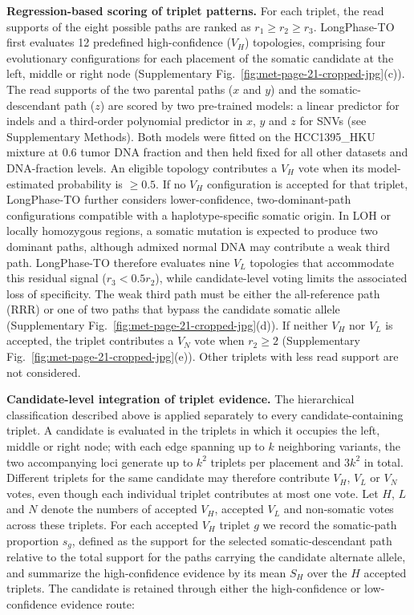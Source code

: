 \documentclass[pdflatex,sn-nature]{sn-jnl}
\begin{document}
\noindent\textbf{Regression-based scoring of triplet patterns.} For each triplet, the read supports of the eight possible paths are ranked as \(r_1\geq r_2\geq r_3\). LongPhase-TO first evaluates 12 predefined high-confidence (\(V_H\)) topologies, comprising four evolutionary configurations for each placement of the somatic candidate at the left, middle or right node (Supplementary Fig.~\ref{fig:met-page-21-cropped-jpg}(c)). The read supports of the two parental paths (\(x\) and \(y\)) and the somatic-descendant path (\(z\)) are scored by two pre-trained models: a linear predictor for indels and a third-order polynomial predictor in \(x\), \(y\) and \(z\) for SNVs (see Supplementary Methods). Both models were fitted on the HCC1395\_HKU mixture at 0.6 tumor DNA fraction and then held fixed for all other datasets and DNA-fraction levels. An eligible topology contributes a \(V_H\) vote when its model-estimated probability is \(\geq0.5\).
If no \(V_H\) configuration is accepted for that triplet, LongPhase-TO further considers lower-confidence, two-dominant-path configurations compatible with a haplotype-specific somatic origin. In LOH or locally homozygous regions, a somatic mutation is expected to produce two dominant paths, although admixed normal DNA may contribute a weak third path. LongPhase-TO therefore evaluates nine \(V_L\) topologies that accommodate this residual signal (\(r_3<0.5r_2\)), while candidate-level voting limits the associated loss of specificity.
The weak third path must be either the all-reference path (RRR) or one of two paths that bypass the candidate somatic allele (Supplementary Fig.~\ref{fig:met-page-21-cropped-jpg}(d)). If neither \(V_H\) nor \(V_L\) is accepted, the triplet contributes a \(V_N\) vote when \(r_2\geq2\) (Supplementary Fig.~\ref{fig:met-page-21-cropped-jpg}(e)). Other triplets with less read support are not considered.

\noindent\textbf{Candidate-level integration of triplet evidence.} The hierarchical classification described above is applied separately to every candidate-containing triplet. A candidate is evaluated in the triplets in which it occupies the left, middle or right node; with each edge spanning up to \(k\) neighboring variants, the two accompanying loci generate up to \(k^2\) triplets per placement and \(3k^2\) in total. Different triplets for the same candidate may therefore contribute \(V_H\), \(V_L\) or \(V_N\) votes, even though each individual triplet contributes at most one vote. Let \(H\), \(L\) and \(N\) denote the numbers of accepted \(V_H\), accepted \(V_L\) and non-somatic votes across these triplets. For each accepted \(V_H\) triplet \(g\) we record the somatic-path proportion \(s_g\), defined as the support for the selected somatic-descendant path relative to the total support for the paths carrying the candidate alternate allele, and summarize the high-confidence evidence by its mean \(S_H\) over the \(H\) accepted triplets. The candidate is retained through either the high-confidence or low-confidence evidence route:
\end{document}
